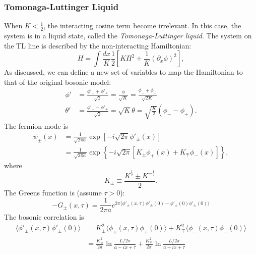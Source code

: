 \subsubsection{Tomonaga-Luttinger Liquid}
When $K<\frac{1}{2}$, the interacting cosine term become irrelevant.
In this case, the system is in a liquid state, called the \textit{Tomonaga-Luttinger liquid}.
The system on the TL line is described by the non-interacting Hamiltonian:
\begin{equation}
	H = \int \frac{dx}{K} \frac{1}{2}\left[K \Pi^2 + \frac{1}{K}(\partial_x\phi)^2 \right],
\end{equation}
As discussed, we can define a new set of variables to map the Hamiltonian to that of the original bosonic model:
\begin{equation}
\begin{aligned}
	\phi' &= \frac{\phi'_-+\phi'_+}{\sqrt 2} = \frac{\phi}{\sqrt{K}} = \frac{\phi_-+\phi_+}{\sqrt{2K}} \\
	\theta' &= \frac{\phi'_--\phi'_+}{\sqrt 2} = \sqrt{K} \theta = \sqrt{\frac{K}{2}}(\phi_--\phi_+).
\end{aligned}
\end{equation}
The fermion mode is
\begin{equation}
\begin{aligned}
	\psi_{\pm}(x) &= \frac{1}{\sqrt{2\pi a}} \exp\left[-i\sqrt{2\pi} \phi'_{\pm}(x) \right] \\
	&= \frac{1}{\sqrt{2\pi a}} \exp\left\{-i\sqrt{2\pi} \left[K_\pm \phi_+(x)+ K_\mp \phi_-(x) \right]\right\},
\end{aligned}
\end{equation}
where 
\begin{equation}
	K_\pm \equiv \frac{K^{\frac{1}{2}} \pm K^{-\frac{1}{2}}}{2}.
\end{equation}
The Greens function is (assume $\tau>0$):
\begin{equation}
	-G_{\pm}(x,\tau) 
	= \frac{1}{2\pi a} e^{2\pi \langle \phi'_\pm(x,\tau)\phi'_\pm(0) - \phi'_\pm(0)\phi'_\pm(0) \rangle}
\end{equation}
The bosonic correlation is
\begin{equation}
\begin{aligned}
	\langle \phi'_\pm(x,\tau)\phi'_\pm(0) \rangle
	&= K_\pm^2 \langle \phi_+(x,\tau)\phi_+(0)\rangle + K_\mp^2 \langle\phi_-(x,\tau)\phi_-(0)\rangle \\
	&= \frac{K_\pm^2}{2\pi}\ln \frac{L/2\pi}{a-ix+\tau} + \frac{K_\mp^2}{2\pi}\ln \frac{L/2\pi}{a+ix +\tau}
\end{aligned}
\end{equation}
